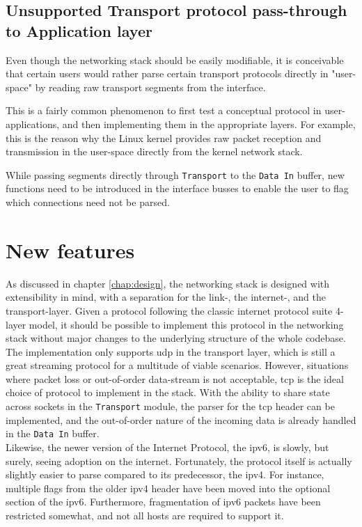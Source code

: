 \subsection{Unsupported Transport protocol pass-through to Application layer}
Even though the networking stack should be easily modifiable, it is conceivable
that certain users would rather parse certain transport protocols directly in
"user-space" by reading raw transport segments from the interface.

This is a fairly common phenomenon to first test a conceptual protocol in
user-applications, and then implementing them in the appropriate layers. For
example, this is the reason why the Linux kernel provides raw packet reception
and transmission in the user-space directly from the kernel network
stack\cite[Version~Linux 5.3-rc6, \texttt{Documentation/networking/tuntap.txt}]{linux}.

While passing segments directly through \texttt{Transport} to the \texttt{Data
In} buffer, new functions need to be introduced in the interface busses to
enable the user to flag which connections need not be parsed.



\section{New features}
As discussed in chapter \ref{chap:design}, the networking stack is designed
with extensibility in mind, with a separation for the link-, the internet-, and
the transport-layer. Given a protocol following the classic internet protocol
suite 4-layer model, it should be possible to implement this protocol in the
networking stack without major changes to the underlying structure of the whole
codebase.\\
The implementation only supports \gls{udp} in the transport layer, which is
still a great streaming protocol for a multitude of viable scenarios. However,
situations where packet loss or out-of-order data-stream is not acceptable,
\gls{tcp} is the ideal choice of protocol to implement in the stack. With the
ability to share state across sockets in the \texttt{Transport} module, the
parser for the \gls{tcp} header can be implemented, and the out-of-order nature
of the incoming data is already handled in the \texttt{Data In} buffer.\\
Likewise, the newer version of the Internet Protocol, the \gls{ipv6}, is slowly, but
surely, seeing adoption on the internet. Fortunately, the protocol itself is
actually slightly easier to parse compared to its predecessor, the \gls{ipv4}.
For instance, multiple flags from the older \gls{ipv4} header have been moved
into the optional section of the \gls{ipv6}. Furthermore, fragmentation of
\gls{ipv6} packets have been restricted somewhat, and not all hosts are required
to support it\cite{ipv6_proposed}.



